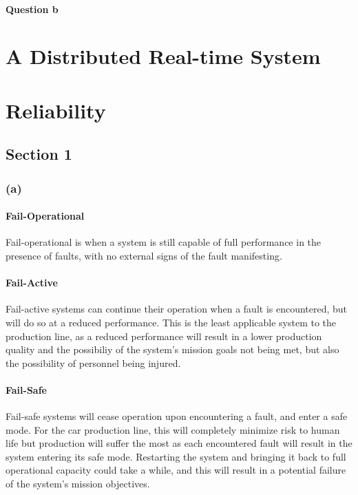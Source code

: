 \documentclass[]{report}
\begin{document}
			\subsubsection{Question b}
	
	\chapter{A Distributed Real-time System}
		
	
	
	\chapter{Reliability}
		\section{Section 1}
			\subsection{(a)}
				\subsubsection{Fail-Operational}
				Fail-operational is when a system is still capable of full performance in the presence of faults, with no external signs of the fault manifesting. 
				
				\subsubsection{Fail-Active}
				Fail-active systems can continue their operation when a fault is encountered, but will do so at a reduced performance. This is the least applicable system to the production line, as a reduced performance will result in a lower production quality and the possibiliy of the system's mission goals not being met, but also the possibility of personnel being injured. 
				
				\subsubsection{Fail-Safe}
				Fail-safe systems will cease operation upon encountering a fault, and enter a safe mode. For the car production line, this will completely minimize risk to human life but production will suffer the most as each encountered fault will result in the system entering its safe mode. Restarting the system and bringing it back to full operational capacity could take a while, and this will result in a potential failure of the system's mission objectives.
				
\end{document}
